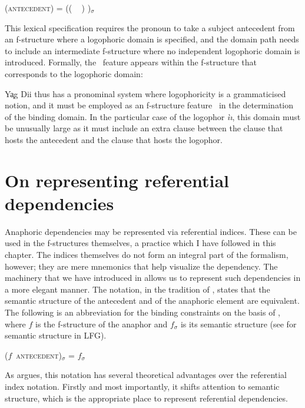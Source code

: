 \documentclass[output=paper,hidelinks]{langscibook}
\begin{document}
(\UPS\textsc{antecedent}) = ((\offp{\GFLOG}{(\RIGHT\LOG)} ~ \offp{\GF*}{$\neg$(\RIGHT\LOG)}\UP)   \SUBJ )$_\sigma$ \smallskip

\noindent This lexical specification requires the pronoun to take a subject antecedent from an f-structure where a logophoric domain is specified, and the domain path needs to include an intermediate f-structure where no independent logophoric domain is introduced. Formally, the \LOG\ feature appears within the f-structure that corresponds to the logophoric domain:


\noindent Y\c{a}g Dii thus has a pronominal system where logophoricity is a grammaticised notion, and it must be employed as an f-structure feature \LOG\ in the determination of the binding domain. In the particular case of the logophor \emph{ìı}, this domain must be unusually large as it must include an extra clause between the clause that hosts the antecedent and the clause that hosts the logophor.

\section{On representing referential dependencies}
\label{sec:Anaphora:5}

Anaphoric dependencies may be represented via referential indices. These can be used in the f-structures themselves, a practice which I have followed in this chapter. The indices themselves do not form an integral part of the formalism, however; they are mere mnemonics that help visualize the dependency. The machinery that we have introduced in  allows us to represent such dependencies in a more elegant manner. The notation, in the tradition of \citet{dalrymple1993}, states that the semantic structure of the antecedent and of the anaphoric element are equivalent. The following is an abbreviation for the binding constraints on the basis of \citet{Asudeh2019-eg}, where $f$ is the f-structure of the anaphor and $f_\sigma$ is its semantic structure (see  for semantic structure in LFG).

\ea\label{ex:Anaphora:41} ($f$~\textsc{antecedent})$_\sigma$ = $f_\sigma$
\z

\noindent As \citet{Asudeh2019-eg} argues, this notation has several theoretical advantages over the referential index notation. Firstly and most importantly, it shifts attention to semantic structure, which is the appropriate place to represent referential dependencies.
\end{document}
